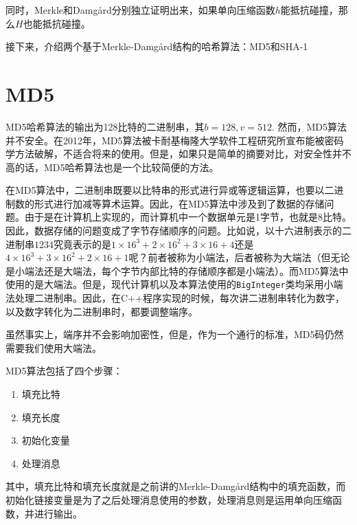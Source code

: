 同时，Merkle和Damg\aa rd分别独立证明出来，如果单向压缩函数$h$能抵抗碰撞，那么$H$也能抵抗碰撞。\par
接下来，介绍两个基于Merkle-Damg\aa rd结构的哈希算法：MD5和SHA-1
\section{MD5}
MD5哈希算法的输出为128比特的二进制串，其$b=128, v=512$. 然而，MD5算法并不安全。在2012年，MD5算法被卡耐基梅隆大学软件工程研究所宣布能被密码学方法破解，不适合将来的使用。但是，如果只是简单的摘要对比，对安全性并不高的话，MD5哈希算法也是一个比较简便的方法。\par
在MD5算法中，二进制串既要以比特串的形式进行异或等逻辑运算，也要以二进制数的形式进行加减等算术运算。因此，在MD5算法中涉及到了数据的存储问题。由于是在计算机上实现的，而计算机中一个数据单元是1字节，也就是8比特。因此，数据存储的问题变成了字节存储顺序的问题。比如说，以十六进制表示的二进制串$1234$究竟表示的是$1\times 16^3+2\times 16^2+3\times 16+4$还是$4\times 16^3+3\times 16^2+2\times 16+1$呢？前者被称为小端法，后者被称为大端法（但无论是小端法还是大端法，每个字节内部比特的存储顺序都是小端法）。而MD5算法中使用的是大端法。但是，现代计算机以及本算法使用的\verb`BigInteger`类均采用小端法处理二进制串。因此，在C++程序实现的时候，每次讲二进制串转化为数字，以及数字转化为二进制串时，都要调整端序。\par
虽然事实上，端序并不会影响加密性，但是，作为一个通行的标准，MD5码仍然需要我们使用大端法。\par
MD5算法包括了四个步骤：
\begin{enumerate}
	\item 填充比特
	\item 填充长度
	\item 初始化变量
	\item 处理消息
\end{enumerate}

其中，填充比特和填充长度就是之前讲的Merkle-Damg\aa rd结构中的填充函数，而初始化链接变量是为了之后处理消息使用的参数，处理消息则是运用单向压缩函数，并进行输出。
